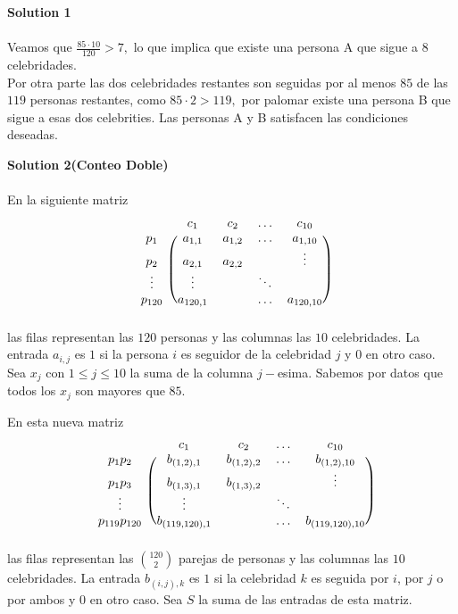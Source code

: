\noindent\textbf{Solution 1}\\\\


Veamos que $\frac{85\cdot 10}{120}>7,$ lo que implica que existe una persona A que sigue a $8$ celebridades.\\
Por otra parte las dos celebridades restantes son seguidas por al menos $85$ de las $119$ personas restantes, como $85\cdot 2>119,$ por palomar existe una persona B que sigue a esas dos celebrities. Las personas A y B satisfacen las condiciones deseadas.

\noindent\textbf{Solution 2(Conteo Doble)}\\\\

En la siguiente matriz
\[
\begin{blockarray}{ccccc}
& c_1 & c_2 & \dots & c_{10} \\
\begin{block}{c(cccc)}
  p_1 & a_{1,1} & a_{1,2} & \dots & a_{1,10}  \\
  p_2 & a_{2,1} & a_{2,2} &  & \vdots \\
  \vdots & \vdots &  & \ddots  &  \\   
  p_{120} & a_{120,1} &  & \dots & a_{120,10} \\
\end{block}
\end{blockarray}
 \]
 las filas representan las $120$ personas y las columnas las $10$ celebridades. La entrada $a_{i,j}$ es $1$ si la persona $i$ es seguidor de la celebridad $j$ y $0$ en otro caso. Sea $x_j$ con $1\le j\le 10$ la suma de la columna $j-$esima. Sabemos por datos que todos los $x_j$ son mayores que $85.$ 

En esta nueva matriz 
\[
\begin{blockarray}{ccccc}
& c_1 & c_2 & \dots & c_{10} \\
\begin{block}{c(cccc)}
  p_1p_2 & b_{(1,2),1} & b_{(1,2),2} & \dots & b_{(1,2),10}  \\
  p_1p_3 & b_{(1,3),1} & b_{(1,3),2} &  & \vdots \\
  \vdots & \vdots &  & \ddots  &  \\   
  p_{119}p_{120} & b_{(119,120),1} &  & \dots & b_{(119,120),10} \\
\end{block}
\end{blockarray}
 \]
las filas representan las ${120\choose{2}}$ parejas de personas y las columnas las $10$ celebridades. La entrada $b_{(i,j), k}$ es $1$ si la celebridad $k$ es seguida por $i$, por $j$ o por ambos y $0$ en otro caso. Sea $S$ la suma de las entradas de esta matriz.\\

